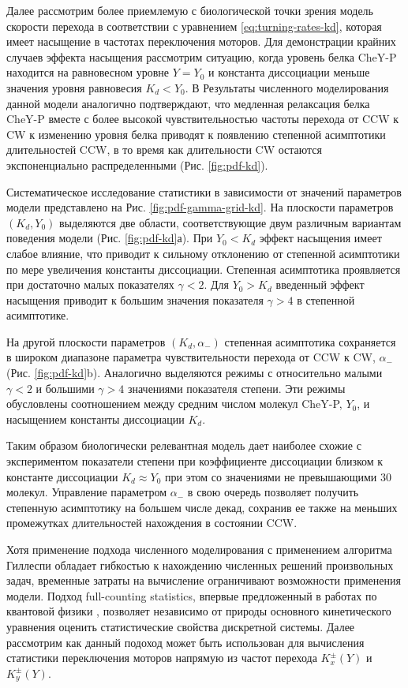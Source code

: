 Далее рассмотрим более приемлемую с биологической точки зрения модель скорости перехода в соответствии с уравнением \cref{eq:turning-rates-kd}, которая имеет насыщение в частотах переключения моторов. Для демонстрации крайних случаев эффекта насыщения рассмотрим ситуацию, когда уровень белка CheY-P находится на равновесном уровне $Y = Y_0$ и константа диссоциации меньше значения уровня равновесия $K_d < Y_0$. В Результаты численного моделирования данной модели аналогично подтверждают, что медленная релаксация белка CheY-P вместе с более высокой чувствительностью частоты перехода от CCW к CW к изменению уровня белка приводят к появлению степенной асимптотики длительностей CCW, в то время как длительности CW остаются экспоненциально распределенными (Рис. \cref{fig:pdf-kd}).

Систематическое исследование статистики в зависимости от значений параметров модели представлено на Рис. \cref{fig:pdf-gamma-grid-kd}. На плоскости параметров $(K_d, Y_0)$ выделяются две области, соответствующие двум различным вариантам поведения модели (Рис. \cref{fig:pdf-kd}а). При $Y_0 < K_d$ эффект насыщения имеет слабое влияние, что приводит к сильному отклонению от степенной асимптотики по мере увеличения константы диссоциации. Степенная асимптотика проявляется при достаточно малых показателях $\gamma < 2$. Для $Y_0 > K_d$ введенный эффект насыщения приводит к большим значения показателя $\gamma > 4$ в степенной асимптотике. 

На другой плоскости параметров $(K_d, \alpha_-)$ степенная асимптотика сохраняется в широком диапазоне параметра чувствительности перехода от CCW к CW, $\alpha_-$ (Рис. \cref{fig:pdf-kd}b). Аналогично выделяются режимы с относительно малыми $\gamma < 2$ и большими $\gamma > 4$ значениями показателя степени. Эти режимы обусловлены соотношением между средним числом молекул CheY-P, $Y_0$, и насыщением константы диссоциации $K_d$.

Таким образом биологически релевантная модель дает наиболее схожие с экспериментом показатели степени при коэффициенте диссоциации близком к константе диссоциации $K_d \approx Y_0$ при этом со значениями не превышающими $30$ молекул. Управление параметром $\alpha_-$ в свою очередь позволяет получить степенную асимптотику на большем числе декад, сохранив ее также на меньших промежутках длительностей нахождения в состоянии CCW.

Хотя применение подхода численного моделирования с применением алгоритма Гиллеспи обладает гибкостью к нахождению численных решений произвольных задач, временные затраты на вычисление ограничивают возможности применения модели. Подход full-counting statistics, впервые предложенный в работах по квантовой физики \cite{}, позволяет независимо от природы основного кинетического уравнения оценить статистические свойства дискретной системы. Далее рассмотрим как данный подоход может быть использован для вычисления статистики переключения моторов напрямую из частот перехода $K_x^\pm(Y)$ и $K_y^\pm(Y)$.

